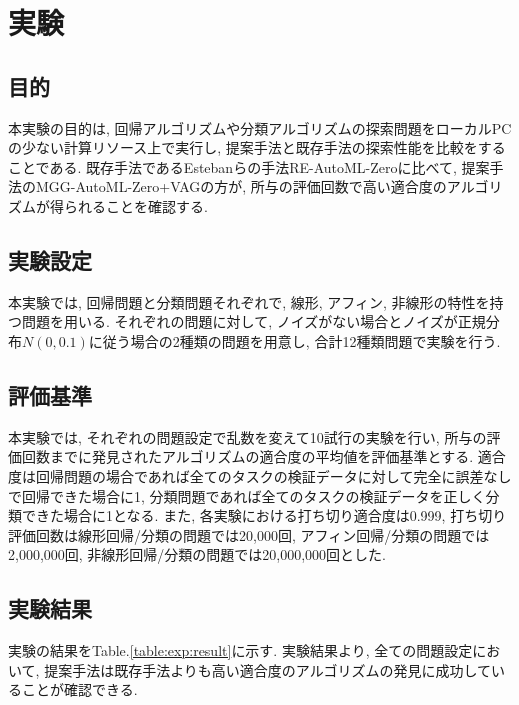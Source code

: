 \documentclass[a4paper,11pt,twocolumn]{jarticle}
\begin{document}
\section{実験} \label{sec:exp}

\subsection{目的}\label{subsec:exp:purpose}

本実験の目的は, 回帰アルゴリズムや分類アルゴリズムの探索問題をローカルPCの少ない計算リソース上で実行し, 提案手法と既存手法の探索性能を比較をすることである. 既存手法であるEstebanらの手法RE-AutoML-Zero\cite{automl_zero}に比べて, 提案手法のMGG-AutoML-Zero+VAGの方が, 所与の評価回数で高い適合度のアルゴリズムが得られることを確認する.

\subsection{実験設定}\label{subsec:exp:setting}
本実験では, 回帰問題と分類問題それぞれで, 線形, アフィン, 非線形の特性を持つ問題を用いる. それぞれの問題に対して, ノイズがない場合とノイズが正規分布$N(0,0.1)$に従う場合の2種類の問題を用意し, 合計12種類問題で実験を行う.

\subsection{評価基準}\label{subsec:exp:eval}

本実験では, それぞれの問題設定で乱数を変えて10試行の実験を行い, 所与の評価回数までに発見されたアルゴリズムの適合度の平均値を評価基準とする. 適合度は回帰問題の場合であれば全てのタスクの検証データに対して完全に誤差なしで回帰できた場合に1, 分類問題であれば全てのタスクの検証データを正しく分類できた場合に1となる. また, 各実験における打ち切り適合度は0.999, 打ち切り評価回数は線形回帰/分類の問題では20,000回, アフィン回帰/分類の問題では2,000,000回, 非線形回帰/分類の問題では20,000,000回とした.

\subsection{実験結果}\label{subsec:exp:result}
実験の結果をTable.\ref{table:exp:result}に示す. 実験結果より, 全ての問題設定において, 提案手法は既存手法よりも高い適合度のアルゴリズムの発見に成功していることが確認できる.
\end{document}
